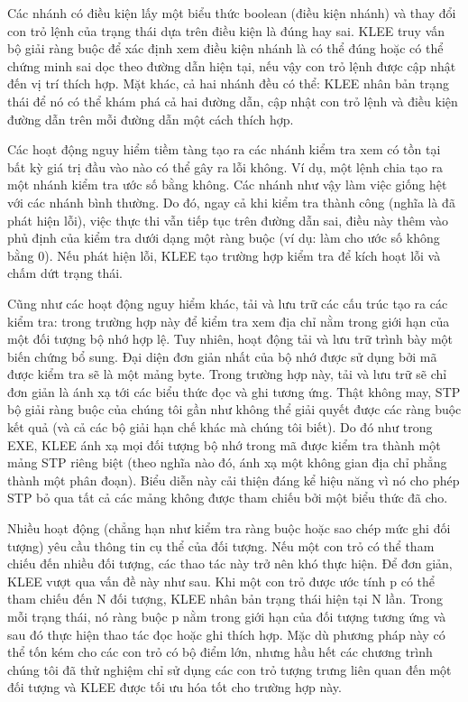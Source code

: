 \documentclass[12pt,a4paper]{article}
\begin{document}
\indent Các nhánh có điều kiện lấy một biểu thức boolean (điều kiện nhánh) và thay đổi con trỏ lệnh của trạng thái dựa trên điều kiện là đúng hay sai. KLEE truy vấn bộ giải ràng buộc để xác định xem điều kiện nhánh là có thể đúng hoặc có thể chứng minh sai dọc theo đường dẫn hiện tại, nếu vậy con trỏ lệnh được cập nhật đến vị trí thích hợp. Mặt khác, cả hai nhánh đều có thể: KLEE nhân bản trạng thái để nó có thể khám phá cả hai đường dẫn, cập nhật con trỏ lệnh và điều kiện đường dẫn trên mỗi đường dẫn một cách thích hợp.

\indent Các hoạt động nguy hiểm tiềm tàng tạo ra các nhánh kiểm tra xem có tồn tại bất kỳ giá trị đầu vào nào có thể gây ra lỗi không. Ví dụ, một lệnh chia tạo ra một nhánh kiểm tra ước số bằng không. Các nhánh như vậy làm việc giống hệt với các nhánh bình thường. Do đó, ngay cả khi kiểm tra thành công (nghĩa là đã phát hiện lỗi), việc thực thi vẫn tiếp tục trên đường dẫn sai, điều này thêm vào phủ định của kiểm tra dưới dạng một ràng buộc (ví dụ: làm cho ước số không bằng 0). Nếu phát hiện lỗi, KLEE tạo trường hợp kiểm tra để kích hoạt lỗi và chấm dứt trạng thái.

\indent Cũng như các hoạt động nguy hiểm khác, tải và lưu trữ các cấu trúc tạo ra các kiểm tra: trong trường hợp này để kiểm tra xem địa chỉ nằm trong giới hạn của một đối tượng bộ nhớ hợp lệ. Tuy nhiên, hoạt động tải và lưu trữ trình bày một biến chứng bổ sung. Đại diện đơn giản nhất của bộ nhớ được sử dụng bởi mã được kiểm tra sẽ là một mảng byte. Trong trường hợp này, tải và lưu trữ sẽ chỉ đơn giản là ánh xạ tới các biểu thức đọc và ghi tương ứng. Thật không may, STP bộ giải ràng buộc của chúng tôi gần như không thể giải quyết được các ràng buộc kết quả (và cả các bộ giải hạn chế khác mà chúng tôi biết). Do đó như trong EXE, KLEE ánh xạ mọi đối tượng bộ nhớ trong mã được kiểm tra thành một mảng STP riêng biệt (theo nghĩa nào đó, ánh xạ một không gian địa chỉ phẳng thành một phân đoạn). Biểu diễn này cải thiện đáng kể hiệu năng vì nó cho phép STP bỏ qua tất cả các mảng không được tham chiếu bởi một biểu thức đã cho. 

\indent Nhiều hoạt động (chẳng hạn như kiểm tra ràng buộc hoặc sao chép mức ghi đối tượng) yêu cầu thông tin cụ thể của đối tượng. Nếu một con trỏ có thể tham chiếu đến nhiều đối tượng, các thao tác này trở nên khó thực hiện. Để đơn giản, KLEE vượt qua vấn đề này như sau. Khi một con trỏ được ước tính p có thể tham chiếu đến N đối tượng, KLEE nhân bản trạng thái hiện tại N lần. Trong mỗi trạng thái, nó ràng buộc p nằm trong giới hạn của đối tượng tương ứng và sau đó thực hiện thao tác đọc hoặc ghi thích hợp. Mặc dù phương pháp này có thể tốn kém cho các con trỏ có bộ điểm lớn, nhưng hầu hết các chương trình chúng tôi đã thử nghiệm chỉ sử dụng các con trỏ tượng trưng liên quan đến một đối tượng và KLEE được tối ưu hóa tốt cho trường hợp này.
\end{document}
